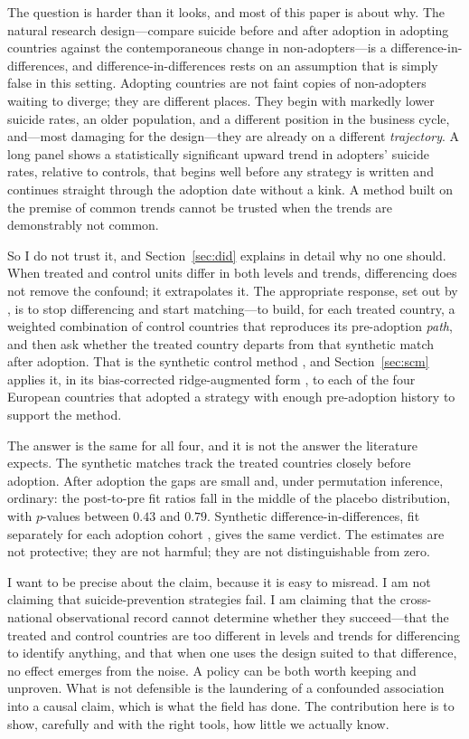 \documentclass[12pt]{article}
\begin{document}
The question is harder than it looks, and most of this paper is about why. The natural research
design---compare suicide before and after adoption in adopting countries against the contemporaneous
change in non-adopters---is a difference-in-differences, and difference-in-differences rests on an
assumption that is simply false in this setting. Adopting countries are not faint copies of
non-adopters waiting to diverge; they are different places. They begin with markedly lower suicide
rates, an older population, and a different position in the business cycle, and---most damaging for
the design---they are already on a different \emph{trajectory}. A long panel shows a statistically
significant upward trend in adopters' suicide rates, relative to controls, that begins well before
any strategy is written and continues straight through the adoption date without a kink. A method
built on the premise of common trends cannot be trusted when the trends are demonstrably not common.

So I do not trust it, and Section~\ref{sec:did} explains in detail why no one should. When treated
and control units differ in both levels and trends, differencing does not remove the confound; it
extrapolates it. The appropriate response, set out by \citet{doudchenko2016balancing}, is to stop
differencing and start matching---to build, for each treated country, a weighted combination of
control countries that reproduces its pre-adoption \emph{path}, and then ask whether the treated
country departs from that synthetic match after adoption. That is the synthetic control method
\citep{abadie2010synthetic}, and Section~\ref{sec:scm} applies it, in its bias-corrected
ridge-augmented form \citep{benmichael2021augmented}, to each of the four European countries that
adopted a strategy with enough pre-adoption history to support the method.

The answer is the same for all four, and it is not the answer the literature expects. The synthetic
matches track the treated countries closely before adoption. After adoption the gaps are small and,
under permutation inference, ordinary: the post-to-pre fit ratios fall in the middle of the placebo
distribution, with $p$-values between $0.43$ and $0.79$. Synthetic difference-in-differences, fit
separately for each adoption cohort \citep{arkhangelsky2021synthetic}, gives the same verdict. The
estimates are not protective; they are not harmful; they are not distinguishable from zero.

I want to be precise about the claim, because it is easy to misread. I am not claiming that
suicide-prevention strategies fail. I am claiming that the cross-national observational record
cannot determine whether they succeed---that the treated and control countries are too different in
levels and trends for differencing to identify anything, and that when one uses the design suited to
that difference, no effect emerges from the noise. A policy can be both worth keeping and unproven.
What is not defensible is the laundering of a confounded association into a causal claim, which is
what the field has done. The contribution here is to show, carefully and with the right tools, how
little we actually know.
\end{document}
